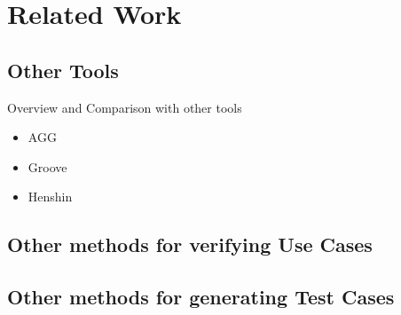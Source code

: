 \chapter{Related Work}

\section{Other Tools}

Overview and Comparison with other tools

\begin{itemize}
\item AGG
\item Groove
\item Henshin
\end{itemize}

\section{Other methods for verifying Use Cases}

\section{Other methods for generating Test Cases}

